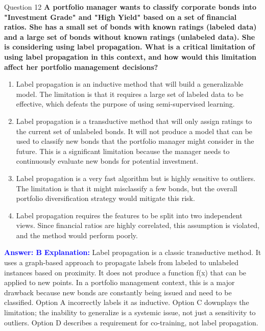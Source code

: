 \documentclass[8pt]{beamer}  %
\begin{document}
	\begin{frame}{Question 12}
		\textbf{A portfolio manager wants to classify corporate bonds into "Investment Grade" and "High Yield" based on a set of financial ratios. She has a small set of bonds with known ratings (labeled data) and a large set of bonds without known ratings (unlabeled data). She is considering using label propagation. What is a critical limitation of using label propagation in this context, and how would this limitation affect her portfolio management decisions?}
		\begin{enumerate}
			\item Label propagation is an inductive method that will build a generalizable model. The limitation is that it requires a large set of labeled data to be effective, which defeats the purpose of using semi-supervised learning.
			\item Label propagation is a transductive method that will only assign ratings to the current set of unlabeled bonds. It will not produce a model that can be used to classify new bonds that the portfolio manager might consider in the future. This is a significant limitation because the manager needs to continuously evaluate new bonds for potential investment.
			\item Label propagation is a very fast algorithm but is highly sensitive to outliers. The limitation is that it might misclassify a few bonds, but the overall portfolio diversification strategy would mitigate this risk.
			\item Label propagation requires the features to be split into two independent views. Since financial ratios are highly correlated, this assumption is violated, and the method would perform poorly.
		\end{enumerate}
		\vspace{0.2cm}
		\textcolor{blue}{\textbf{Answer: B}}
		\vspace{0.2cm}
		\textcolor{blue}{\textbf{Explanation:}} Label propagation is a classic transductive method. It uses a graph-based approach to propagate labels from labeled to unlabeled instances based on proximity. It does not produce a function f(x) that can be applied to new points. In a portfolio management context, this is a major drawback because new bonds are constantly being issued and need to be classified. Option A incorrectly labels it as inductive. Option C downplays the limitation; the inability to generalize is a systemic issue, not just a sensitivity to outliers. Option D describes a requirement for co-training, not label propagation.
	\end{frame}
	
\end{document}
